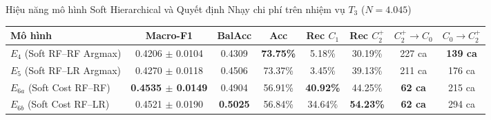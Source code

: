\begin{table}{Hiệu năng mô hình Soft Hierarchical và Quyết định Nhạy chi phí trên nhiệm vụ $T_3$ ($N = 4.045$)}
\centering
\small
\setlength{\tabcolsep}{4.5pt}
\label{tab:soft-cost-results}
\begin{tabular}{l c c c c c c c}
\toprule
\textbf{Mô hình} & \textbf{Macro-F1} & \textbf{BalAcc} & \textbf{Acc} & \textbf{Rec $C_1$} & \textbf{Rec $C_2^+$} & \textbf{$C_2^+ \to C_0$} & \textbf{$C_0 \to C_2^+$} \\
\midrule
$E_4$ (Soft RF--RF Argmax) & 0.4206 $\pm$ 0.0104 & 0.4309 & \textbf{73.75\%} & 5.18\% & 30.19\% & 227 ca & \textbf{139 ca} \\
$E_5$ (Soft RF--LR Argmax) & 0.4270 $\pm$ 0.0118 & 0.4506 & 73.37\% & 3.45\% & 39.13\% & 211 ca & 176 ca \\
$E_{6a}$ (Soft Cost RF--RF) & \textbf{0.4535 $\pm$ 0.0149} & 0.4904 & 56.91\% & \textbf{40.92\%} & 44.25\% & \textbf{62 ca} & 215 ca \\
$E_{6b}$ (Soft Cost RF--LR) & 0.4521 $\pm$ 0.0190 & \textbf{0.5025} & 56.84\% & 34.64\% & \textbf{54.23\%} & \textbf{62 ca} & 294 ca \\
\bottomrule
\end{tabular}
\end{table}
